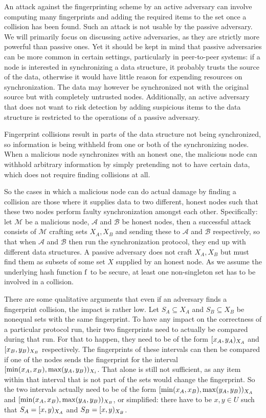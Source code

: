 An attack against the fingerprinting scheme by an active adversary can involve computing many fingerprints and adding the required items to the set once a collision has been found. Such an attack is not usable by the passive adversary. We will primarily focus on discussing active adversaries, as they are strictly more powerful than passive ones. Yet it should be kept in mind that passive adversaries can be more common in certain settings, particularly in peer-to-peer systems: if a node is interested in synchronizing a data structure, it probably trusts the source of the data, otherwise it would have little reason for expending resources on synchronization. The data may however be synchronized not with the original source but with completely untrusted nodes. Additionally, an active adversary that does not want to risk detection by adding suspicious items to the data structure is restricted to the operations of a passive adversary.

Fingerprint collisions result in parts of the data structure not being synchronized, so information is being withheld from one or both of the synchronizing nodes. When a malicious node synchronizes with an honest one, the malicious node can withhold arbitrary information by simply pretending not to have certain data, which does not require finding collisions at all.

So the cases in which a malicious node can do actual damage by finding a collision are those where it supplies data to two different, honest nodes such that these two nodes perform faulty synchronization amongst each other. Specifically: let $\mathcal{M}$ be a malicious node, $\mathcal{A}$ and $\mathcal{B}$ be honest nodes, then a successful attack consists of $\mathcal{M}$ crafting sets $X_A, X_B$ and sending these to $\mathcal{A}$ and $\mathcal{B}$ respectively, so that when $\mathcal{A}$ and $\mathcal{B}$ then run the synchronization protocol, they end up with different data structures. A passive adversary does not craft $X_A, X_B$ but must find them as subsets of some set $X$ supplied by an honest node. As we assume the underlying hash function $\operatorname{f}$ to be secure, at least one non-singleton set has to be involved in a collision.

There are some qualitative arguments that even if an adversary finds a fingerprint collision, the impact is rather low. Let $S_A \subseteq X_A$ and $S_B \subseteq X_B$ be nonequal sets with the same fingerprint. To have any impact on the correctness of a particular protocol run, their two fingerprints need to actually be compared during that run. For that to happen, they need to be of the form $[{x_A},{y_A})_{X_A}$ and $[{x_B},{y_B})_{X_B}$ respectively. The fingerprints of these intervals can then be compared if one of the nodes sends the fingerprint for the interval $[{\min(x_A, x_B)},{\max(y_A, y_B)})_{X_i}$. That alone is still not sufficient, as any item within that interval that is not part of the sets would change the fingerprint. So the two intervals actually need to be of the form $[{\min(x_A, x_B)},{\max(y_A, y_B)})_{X_A}$ and $[{\min(x_A, x_B)},{\max(y_A, y_B)})_{X_B}$, or simplified: there have to be $x, y \in U$ such that $S_A = [{x},{y})_{X_A}$ and $S_B = [{x},{y})_{X_B}$.

